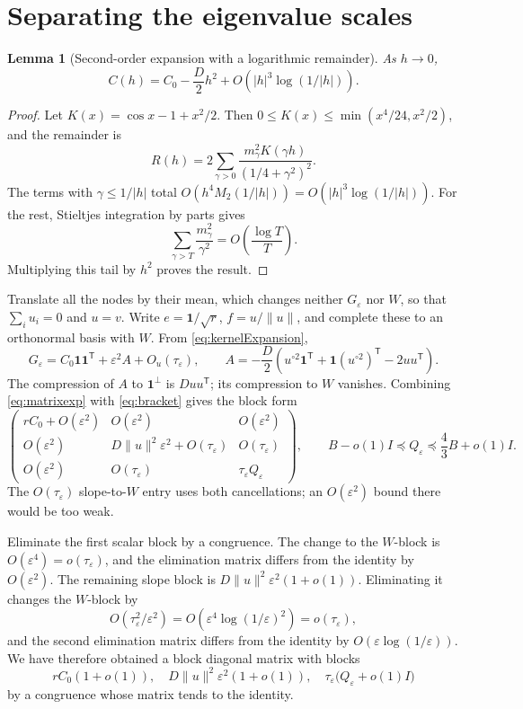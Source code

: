 \documentclass[11pt]{article}
\newtheorem{lemma}[theorem]{Lemma}
\theoremstyle{definition}\newtheorem{definition}[theorem]{Definition}
\theoremstyle{remark}\newtheorem{remark}[theorem]{Remark}
\newcommand{\eps}{\varepsilon}
\newcommand{\one}{\mathbf1}
\newcommand{\tr}{\mathsf T}
\newcommand{\tauE}{\tau_\eps}
\begin{document}
\section{Separating the eigenvalue scales}\label{sec:eigen}
\begin{lemma}[Second-order expansion with a logarithmic remainder]
As $h\to0$,
\begin{equation}\label{eq:kernelExpansion}
 C(h)=C_0-\frac D2h^2+O\!\left(|h|^3\log(1/|h|)\right).
\end{equation}
\end{lemma}
\begin{proof}
Let $K(x)=\cos x-1+x^2/2$. Then
$0\le K(x)\le\min(x^4/24,x^2/2)$, and the remainder is
\[
 R(h)=2\sum_{\gamma>0}
       \frac{m_\gamma^2K(\gamma h)}{(1/4+\gamma^2)^2}.
\]
The terms with $\gamma\le1/|h|$ total
$O(h^4 M_2(1/|h|))=O(|h|^3\log(1/|h|))$.
For the rest, Stieltjes integration by parts gives
\[
 \sum_{\gamma>T}\frac{m_\gamma^2}{\gamma^2}
 =O\!\left(\frac{\log T}{T}\right).
\]
Multiplying this tail by $h^2$ proves the result.
\end{proof}

Translate all the nodes by their mean, which changes neither $G_\eps$
nor $W$, so that $\sum_i u_i=0$ and $u=v$. Write
$e=\one/\sqrt r$, $f=u/\|u\|$, and complete these to an orthonormal
basis with $W$. From \eqref{eq:kernelExpansion},
\begin{equation}\label{eq:matrixexp}
 G_\eps=C_0\one\one^\tr+\eps^2 A+O_u(\tauE),\qquad
 A=-\frac D2\left(u^{\circ2}\one^\tr+
             \one(u^{\circ2})^\tr-2uu^\tr\right).
\end{equation}
The compression of $A$ to $\one^\perp$ is $Duu^\tr$; its compression to
$W$ vanishes. Combining \eqref{eq:matrixexp} with
\eqref{eq:bracket} gives the block form
\begin{equation}\label{eq:blocks}
 \begin{pmatrix}
 rC_0+O(\eps^2)&O(\eps^2)&O(\eps^2)\\
 O(\eps^2)&D\|u\|^2\eps^2+O(\tauE)&O(\tauE)\\
 O(\eps^2)&O(\tauE)&\tauE Q_\eps
 \end{pmatrix},\qquad
 B-o(1)I\preceq Q_\eps\preceq\frac43B+o(1)I.
\end{equation}
The $O(\tauE)$ slope-to-$W$ entry uses both cancellations; an
$O(\eps^2)$ bound there would be too weak.

Eliminate the first scalar block by a congruence. The change to the
$W$-block is $O(\eps^4)=o(\tauE)$, and the elimination matrix differs
from the identity by $O(\eps^2)$. The remaining slope block is
$D\|u\|^2\eps^2(1+o(1))$. Eliminating it changes the $W$-block by
\[
 O(\tauE^2/\eps^2)=O(\eps^4\log(1/\eps)^2)=o(\tauE),
\]
and the second elimination matrix differs from the identity by
$O(\eps\log(1/\eps))$. We have therefore obtained a block diagonal
matrix with blocks
\begin{equation}\label{eq:diagonal}
 rC_0(1+o(1)),\quad
 D\|u\|^2\eps^2(1+o(1)),\quad
 \tauE\bigl(Q_\eps+o(1)I\bigr)
\end{equation}
by a congruence whose matrix tends to the identity.
\end{document}
